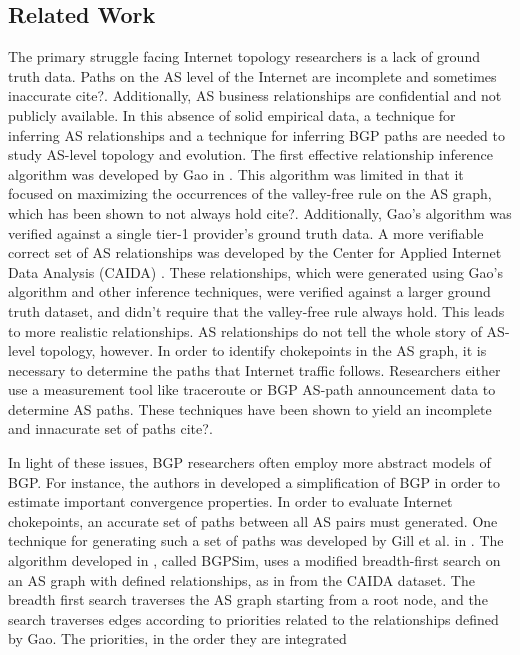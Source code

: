 \documentclass{article}
\begin{document}
\begin{multicols}{2}
\section{Related Work}
The primary struggle facing Internet topology researchers is
a lack of ground truth data. Paths on the AS level of the Internet are
incomplete and sometimes inaccurate {\color{blue}cite?}. Additionally, AS business
relationships are confidential and not publicly available. In this absence of
solid empirical data, a technique for inferring AS relationships and a
technique for inferring BGP paths are needed to study AS-level topology and
evolution. The first effective relationship inference algorithm was developed
by Gao in \cite{gao}. This algorithm was limited in that it focused on
maximizing the occurrences of the valley-free rule on the AS graph, which has
been shown to not always hold {\color{blue}cite?}. Additionally, Gao's algorithm was
verified against a single tier-1 provider's ground truth data. A more
verifiable correct set of AS relationships was developed by the Center for
Applied Internet Data Analysis (CAIDA) \cite{CAIDApaper}. These relationships,
which were generated using Gao's algorithm and other inference techniques,
were verified against a larger ground truth dataset, and didn't require that
the valley-free rule always hold. This leads to more realistic relationships. AS
relationships do not tell the whole story of AS-level topology, however. In
order to identify chokepoints in the AS graph, it is necessary to determine
the paths that Internet traffic follows. Researchers either use a measurement
tool like traceroute or BGP AS-path announcement data to determine AS paths.
These techniques have been shown to yield an incomplete and innacurate set of
paths {\color{blue}cite?}. 
\par
In light of these issues, BGP researchers often employ more abstract models of BGP.
For instance, the authors in \cite{converge} developed a simplification of BGP in order
to estimate important convergence properties. In order to evaluate Internet chokepoints,
an accurate set of paths between all AS pairs must generated. One technique for generating such
a set of paths was developed by Gill et al. in \cite{quicksand}. The algorithm
developed in \cite{quicksand}, called BGPSim, uses a modified breadth-first
search on an AS graph with defined relationships, as in from the CAIDA
dataset. The breadth first search traverses the AS graph starting from a root
node, and the search traverses edges according to priorities related to the
relationships defined by Gao. The priorities, in the order they are integrated

\end{multicols}
\end{document}
